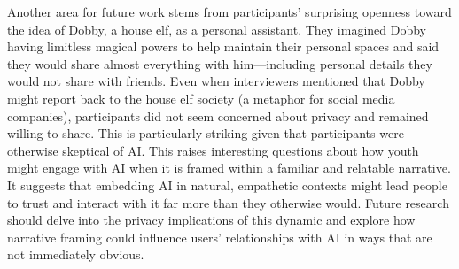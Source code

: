 Another area for future work stems from participants' surprising openness toward the idea of Dobby, a house elf, as a personal assistant. They imagined Dobby having limitless magical powers to help maintain their personal spaces and said they would share almost everything with him---including personal details they would not share with friends. Even when interviewers mentioned that Dobby might report back to the house elf society (a metaphor for social media companies), participants did not seem concerned about privacy and remained willing to share. This is particularly striking given that participants were otherwise skeptical of AI. This raises interesting questions about how youth might engage with AI when it is framed within a familiar and relatable narrative. It suggests that embedding AI in natural, empathetic contexts might lead people to trust and interact with it far more than they otherwise would. Future research should delve into the privacy implications of this dynamic and explore how narrative framing could influence users' relationships with AI in ways that are not immediately obvious.
